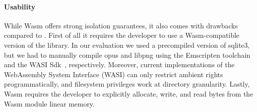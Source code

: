 \paragraph{Usability}
%
While Wasm offers strong isolation guarantees, it also comes with drawbacks compared to \natisand. First of all it requires the developer
to use a Wasm-compatible version of the library. In our evaluation we
used a precompiled version of sqlite3, but we had to manually compile
opus and libpng using the Emscripten toolchain~\cite{emscripten} and
the WASI Sdk~\cite{wasi-sdk}, respectively. Moreover, current implementations of the WebAssembly
System Interface (WASI) can only restrict ambient rights
programmatically, and filesystem privileges work at
directory granularity. Lastly, Wasm requires the developer to
explicitly allocate, write, and read bytes from the Wasm module linear
memory.


